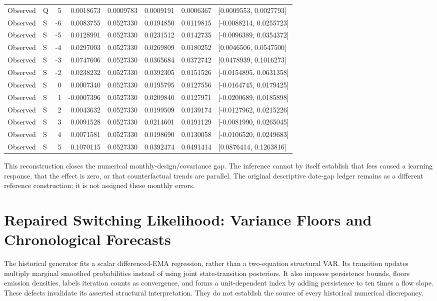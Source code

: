 {\begin{longtable}{llrrrrrl}
Observed & Q & 5 & 0.0018673 & 0.0009783 & 0.0009191 & 0.0006367 & [0.0009553, 0.0027793]\\
Observed & S & -6 & 0.0083755 & 0.0527330 & 0.0194850 & 0.0119815 & [-0.0088214, 0.0255723]\\
Observed & S & -5 & 0.0128991 & 0.0527330 & 0.0231512 & 0.0142735 & [-0.0096389, 0.0354372]\\
Observed & S & -4 & 0.0297003 & 0.0527330 & 0.0269809 & 0.0180252 & [0.0046506, 0.0547500]\\
Observed & S & -3 & 0.0747606 & 0.0527330 & 0.0365684 & 0.0372742 & [0.0478939, 0.1016273]\\
Observed & S & -2 & 0.0238232 & 0.0527330 & 0.0392305 & 0.0151526 & [-0.0154895, 0.0631358]\\
Observed & S & 0 & 0.0007340 & 0.0527330 & 0.0195795 & 0.0127556 & [-0.0164745, 0.0179425]\\
Observed & S & 1 & -0.0007396 & 0.0527330 & 0.0209840 & 0.0127971 & [-0.0200689, 0.0185898]\\
Observed & S & 2 & 0.0043632 & 0.0527330 & 0.0199509 & 0.0139174 & [-0.0127962, 0.0215226]\\
Observed & S & 3 & 0.0091528 & 0.0527330 & 0.0214601 & 0.0191129 & [-0.0081990, 0.0265045]\\
Observed & S & 4 & 0.0071581 & 0.0527330 & 0.0198690 & 0.0130058 & [-0.0106520, 0.0249683]\\
Observed & S & 5 & 0.1070115 & 0.0527330 & 0.0392474 & 0.0491414 & [0.0876414, 0.1263816]\\
\end{longtable}
}
This reconstruction closes the numerical monthly-design/covariance gap. The inference cannot by itself establish that fees caused a learning response, that the effect is zero, or that counterfactual trends are parallel. The original descriptive date-gap ledger remains as a different reference construction; it is not assigned these monthly errors.


\section{Repaired Switching Likelihood: Variance Floors and Chronological Forecasts}
\label{sec:regime_repaired}
The historical generator fits a scalar differenced-EMA regression, rather than a two-equation structural VAR. Its transition updates multiply marginal smoothed probabilities instead of using joint state-transition posteriors. It also imposes persistence bounds, floors emission densities, labels iteration counts as convergence, and forms a unit-dependent index by adding persistence to ten times a flow slope. These defects invalidate its asserted structural interpretation. They do not establish the source of every historical numerical discrepancy.

